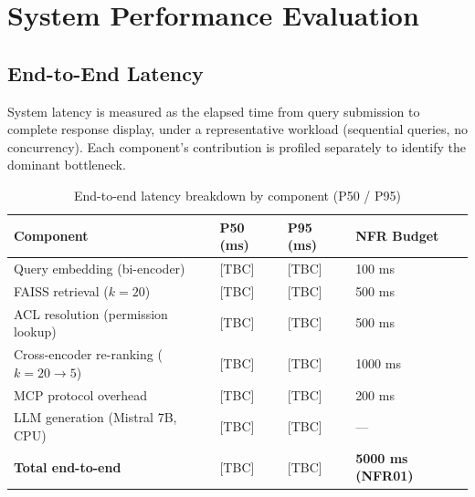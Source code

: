 
\section{System Performance Evaluation}
\label{sec:eval-performance}

\subsection{End-to-End Latency}

System latency is measured as the elapsed time from query submission to complete response display, under a representative workload (sequential queries, no concurrency). Each component's contribution is profiled separately to identify the dominant bottleneck.

\begin{table}[H]
\centering
\caption{End-to-end latency breakdown by component (P50 / P95)}
\label{tab:latency-breakdown}
\begin{tabularx}{\textwidth}{@{}lXXX@{}}
\toprule
\textbf{Component} & \textbf{P50 (ms)} & \textbf{P95 (ms)} & \textbf{NFR Budget} \\
\midrule
Query embedding (bi-encoder) & [TBC] & [TBC] & 100 ms \\
FAISS retrieval ($k=20$) & [TBC] & [TBC] & 500 ms \\
ACL resolution (permission lookup) & [TBC] & [TBC] & 500 ms \\
Cross-encoder re-ranking ($k=20 \to 5$) & [TBC] & [TBC] & 1000 ms \\
MCP protocol overhead & [TBC] & [TBC] & 200 ms \\
LLM generation (Mistral 7B, CPU) & [TBC] & [TBC] & --- \\
\textbf{Total end-to-end} & [TBC] & [TBC] & \textbf{5000 ms (NFR01)} \\
\bottomrule
\end{tabularx}
\end{table}

